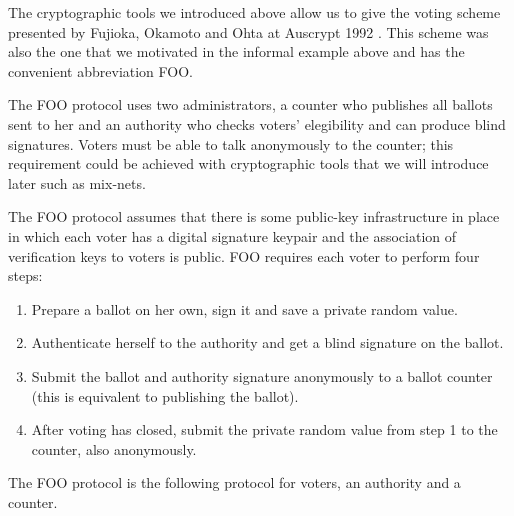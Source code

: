 \documentclass{llncs}
\begin{document}
The cryptographic tools we introduced above allow us to give the voting scheme
presented by Fujioka, Okamoto and Ohta at Auscrypt 1992 \cite{FOO92}. This
scheme was also the one that we motivated in the informal example above and has
the convenient abbreviation FOO.

The FOO protocol uses two administrators, a counter who publishes all ballots
sent to her and an authority who checks voters' elegibility and can produce
blind signatures. Voters must be able to talk anonymously to the counter; this
requirement could be achieved with cryptographic tools that we will introduce
later such as mix-nets.

The FOO protocol assumes that there is some public-key infrastructure in place
in which each voter has a digital signature keypair and the association of
verification keys to voters is public. FOO requires each voter to perform four
steps:
\begin{enumerate}
\item Prepare a ballot on her own, sign it and save a private random value.
\item Authenticate herself to the authority and get a blind signature on the ballot.
\item Submit the ballot and authority signature anonymously to a ballot counter (this is equivalent to publishing the ballot).
\item After voting has closed, submit the private random value from step 1 to the counter, also anonymously.
\end{enumerate}

\begin{definition}
The FOO protocol is the following protocol for voters, an authority and a counter.
\end{definition}
\end{document}
